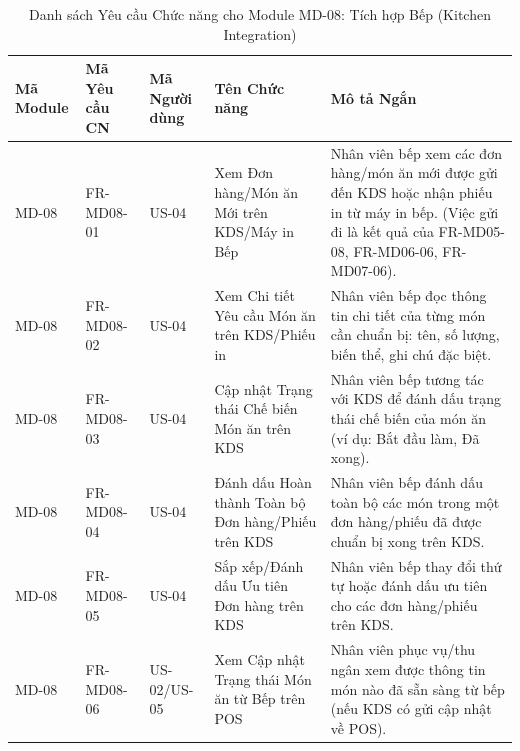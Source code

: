 \begin{longtable}{|m{2cm}|m{2.5cm}|m{2.5cm}|m{4.5cm}|m{4cm}|}
\caption{Danh sách Yêu cầu Chức năng cho Module MD-08: Tích hợp Bếp (Kitchen Integration)} \label{tab:fr_md08_revised_v2} \\
\hline
\textbf{Mã Module} & \textbf{Mã Yêu cầu CN} & \textbf{Mã Người dùng} & \textbf{Tên Chức năng} & \textbf{Mô tả Ngắn} \\
\hline
\endhead %
\hline
\endfoot %
\hline
\endlastfoot %

MD-08 & FR-MD08-01 & US-04 & Xem Đơn hàng/Món ăn Mới trên KDS/Máy in Bếp & Nhân viên bếp xem các đơn hàng/món ăn mới được gửi đến KDS hoặc nhận phiếu in từ máy in bếp. (Việc gửi đi là kết quả của FR-MD05-08, FR-MD06-06, FR-MD07-06). \\
\hline
MD-08 & FR-MD08-02 & US-04 & Xem Chi tiết Yêu cầu Món ăn trên KDS/Phiếu in & Nhân viên bếp đọc thông tin chi tiết của từng món cần chuẩn bị: tên, số lượng, biến thể, ghi chú đặc biệt. \\
\hline
MD-08 & FR-MD08-03 & US-04 & Cập nhật Trạng thái Chế biến Món ăn trên KDS & Nhân viên bếp tương tác với KDS để đánh dấu trạng thái chế biến của món ăn (ví dụ: Bắt đầu làm, Đã xong). \\
\hline
MD-08 & FR-MD08-04 & US-04 & Đánh dấu Hoàn thành Toàn bộ Đơn hàng/Phiếu trên KDS & Nhân viên bếp đánh dấu toàn bộ các món trong một đơn hàng/phiếu đã được chuẩn bị xong trên KDS. \\
\hline
MD-08 & FR-MD08-05 & US-04 & Sắp xếp/Đánh dấu Ưu tiên Đơn hàng trên KDS & Nhân viên bếp thay đổi thứ tự hoặc đánh dấu ưu tiên cho các đơn hàng/phiếu trên KDS. \\
\hline
MD-08 & FR-MD08-06 & US-02/US-05 & Xem Cập nhật Trạng thái Món ăn từ Bếp trên POS & Nhân viên phục vụ/thu ngân xem được thông tin món nào đã sẵn sàng từ bếp (nếu KDS có gửi cập nhật về POS). \\
\hline

\end{longtable}


